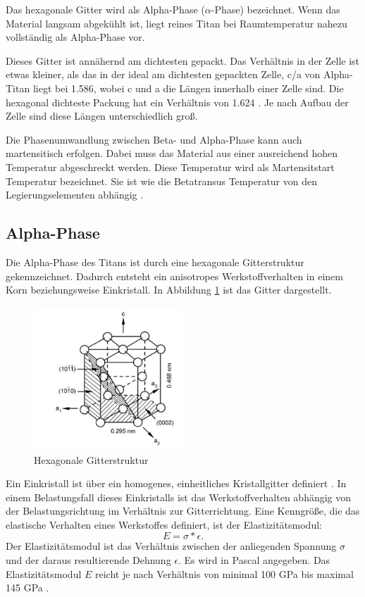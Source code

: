 \documentclass[a4paper, 11pt]{tubsreprt}
\begin{document}
Das hexagonale Gitter wird als Alpha-Phase ($\alpha$-Phase) bezeichnet. Wenn das Material langsam abgekühlt ist, liegt reines Titan bei Raumtemperatur nahezu vollständig als Alpha-Phase vor. 

Dieses Gitter ist annähernd am dichtesten gepackt. Das Verhältnis in der Zelle ist etwas kleiner, als das in der ideal am dichtesten gepackten Zelle, c/a von Alpha-Titan liegt bei 1.586, wobei c und a die Längen innerhalb einer Zelle sind. Die hexagonal dichteste Packung hat ein Verhältnis von 1.624 \cite{Luetjering2007}. Je nach Aufbau der Zelle sind diese Längen unterschiedlich groß.

Die Phasenumwandlung zwischen Beta- und Alpha-Phase kann auch martensitisch erfolgen. Dabei muss das Material aus einer ausreichend hohen Temperatur abgeschreckt werden. Diese Temperatur wird als Martensitstart Temperatur bezeichnet. Sie ist wie die Betatransus Temperatur von den Legierungselementen abhängig \cite{Luetjering2007}.

\subsection{Alpha-Phase}
Die Alpha-Phase des Titans ist durch eine hexagonale Gitterstruktur gekennzeichnet. Dadurch entsteht ein anisotropes Werkstoffverhalten in einem Korn beziehungsweise Einkristall. In Abbildung \ref{Hexagonale Gitterstruktur} ist das Gitter dargestellt. 

\begin{figure}[h]
\centering
\includegraphics[width=0.5\textwidth]{Bilder/HexagonalesGitter.jpg}
\caption{Hexagonale Gitterstruktur \cite{Luetjering2007}}
\label{Hexagonale Gitterstruktur}
\end{figure}
Ein Einkristall ist über ein homogenes, einheitliches Kristallgitter definiert \cite{Luetjering2007}.
In einem Belastungsfall dieses Einkristalls ist das Werkstoffverhalten abhängig von der Belastungsrichtung im Verhältnis zur Gitterrichtung. Eine Kenngröße, die das elastische Verhalten eines Werkstoffes definiert, ist der Elastizitätsmodul: 
\begin{equation}
E=\sigma*\epsilon.
\end{equation}
Der Elastizitätsmodul ist das Verhältnis zwischen der anliegenden Spannung $\sigma$ und der daraus resultierende Dehnung $\epsilon$.
Es wird in Pascal angegeben. Das Elastizitätsmodul $E$ reicht je nach Verhältnis von minimal 100 GPa bis maximal 145 GPa \cite{Luetjering2007}.
\end{document}
